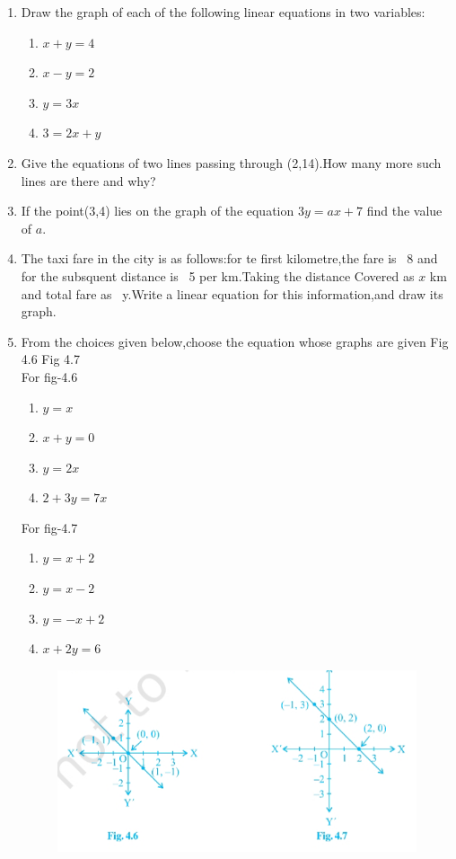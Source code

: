 \begin{enumerate}[label=\arabic*.,ref=\theenumi]
\item Draw the graph of each of the following linear equations in two variables:
\begin{enumerate}[label=(\roman*),ref=\theenumi]
\item $x+y=4$
\item $x-y=2$
\item $y=3x$
\item $3=2x+y$
\end{enumerate}
\item Give the equations of two lines passing through (2,14).How many more such lines are there and 
why?
\item If the point(3,4) lies on the graph of the equation $3y=ax+7$ find the value of $a$.
\item The taxi fare in the city is as follows:for te first kilometre,the fare is \rupee~8 and for the 
subsquent distance is \rupee~5 per km.Taking the distance Covered as $x$ km and total fare as
\rupee~y.Write a linear equation for this information,and draw its graph.
\item From the choices given below,choose the equation whose graphs are given Fig 4.6 Fig 4.7
\\
For fig-4.6 
\begin{enumerate}[label=(\roman*)]
\item $y=x$
\item $x+y=0$
\item $y=2x$
\item $2+3y=7x$
\end{enumerate} 
For fig-4.7 
\begin{enumerate}[label=(\roman*)]
\item $y=x+2$
\item $y=x-2$
\item $y=-x+2$
\item $x+2y=6$
\end{enumerate}
\begin{figure}[ht]
\centering
\includegraphics[width=\columnwidth]{chapters/9/figs/4.6-4.7.png}

\end{figure}
\end{enumerate}
